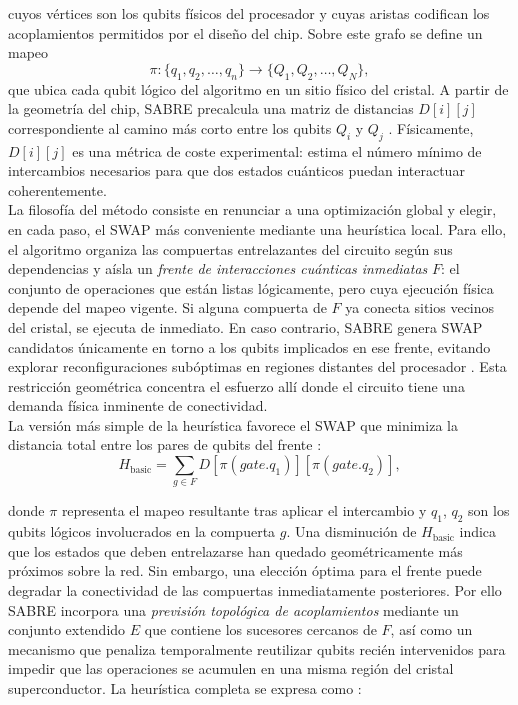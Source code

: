 \documentclass[12pt, spanish]{book}
\begin{document}
cuyos vértices son los qubits físicos del procesador y cuyas aristas codifican los acoplamientos permitidos por el diseño del chip. Sobre este grafo se define un mapeo
\begin{equation}
    \pi:\{q_1,q_2,\dots,q_n\} \to \{Q_1,Q_2,\dots,Q_N\},
\end{equation}
que ubica cada qubit lógico del algoritmo en un sitio físico del cristal. A partir de la geometría del chip, SABRE precalcula una matriz de distancias $D[i][j]$ correspondiente al camino más corto entre los qubits $Q_i$ y $Q_j$ \cite{Li2019SABRE}. Físicamente, $D[i][j]$ es una métrica de coste experimental: estima el número mínimo de intercambios necesarios para que dos estados cuánticos puedan interactuar coherentemente.\\

La filosofía del método consiste en renunciar a una optimización global y elegir, en cada paso, el SWAP más conveniente mediante una heurística local. Para ello, el algoritmo organiza las compuertas entrelazantes del circuito según sus dependencias y aísla un \emph{frente de interacciones cuánticas inmediatas} $F$: el conjunto de operaciones que están listas lógicamente, pero cuya ejecución física depende del mapeo vigente. Si alguna compuerta de $F$ ya conecta sitios vecinos del cristal, se ejecuta de inmediato. En caso contrario, SABRE genera SWAP candidatos únicamente en torno a los qubits implicados en ese frente, evitando explorar reconfiguraciones subóptimas en regiones distantes del procesador \cite{Li2019SABRE}. Esta restricción geométrica concentra el esfuerzo allí donde el circuito tiene una demanda física inminente de conectividad.\\

La versión más simple de la heurística favorece el SWAP que minimiza la distancia total entre los pares de qubits del frente \cite{Li2019SABRE}:
\begin{equation}
    H_{\mathrm{basic}}=\sum_{g\in F} D\left[\pi(gate.q_1)\right]\left[\pi(gate.q_2)\right],
    \label{eq:sabre_basic}
\end{equation}

donde $\pi$ representa el mapeo resultante tras aplicar el intercambio y $q_1$, $q_2$ son los qubits lógicos involucrados en la compuerta $g$. Una disminución de $H_{\mathrm{basic}}$ indica que los estados que deben entrelazarse han quedado geométricamente más próximos sobre la red. Sin embargo, una elección óptima para el frente puede degradar la conectividad de las compuertas inmediatamente posteriores. Por ello SABRE incorpora una \emph{previsión topológica de acoplamientos} mediante un conjunto extendido $E$ que contiene los sucesores cercanos de $F$, así como un mecanismo que penaliza temporalmente reutilizar qubits recién intervenidos para impedir que las operaciones se acumulen en una misma región del cristal superconductor. La heurística completa se expresa como \cite{Li2019SABRE}:
\end{document}

